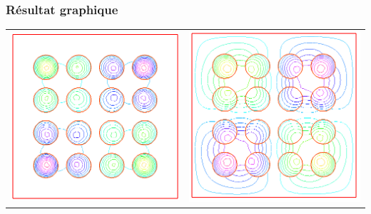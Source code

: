 \documentclass{article}
\begin{document}
\subsubsection*{Résultat graphique}
\begin{center}
\begin{tabular}{cc}

  \includegraphics[scale=0.5]{img/q8-1.png}	
  &
  \includegraphics[scale=0.5]{img/q8-2.png}	
	\\
	

\end{tabular}
\end{center}
\end{document}
